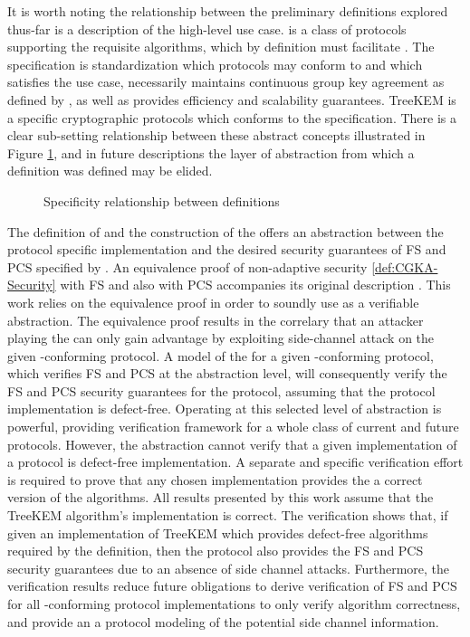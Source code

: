 It is worth noting the relationship between the preliminary definitions explored thus-far
 is a description of the high-level use case.
 is a class of protocols supporting the requisite algorithms, which by definition must facilitate .
The  specification is standardization which protocols may conform to and which satisfies the  use case, necessarily maintains continuous group key agreement as defined by , as well as provides efficiency and scalability guarantees.
TreeKEM is a specific cryptographic protocols which conforms to the  specification.
There is a clear sub-setting relationship between these abstract concepts illustrated in Figure \ref{fig:venn-protocols}, and in future descriptions the layer of abstraction from which a definition was defined may be elided.

\begin{figure}
\centering
\caption{\label{fig:venn-protocols}Specificity relationship between definitions}
\end{figure}

The definition of  and the construction of the \CGKAsec offers an abstraction between the protocol specific implementation and the desired security guarantees of FS and PCS specified by .
An equivalence proof of non-adaptive  security \ref{def:CGKA-Security} with FS and also with PCS accompanies its original description \autocite{alwen2020security}.
This work relies on the equivalence proof in order to soundly use  as a verifiable abstraction.
The equivalence proof results in the correlary that an attacker playing the \CGKAsec can only gain advantage by exploiting side-channel attack on the given -conforming protocol.
A model of the \CGKAsec for a given -conforming protocol, which verifies FS and PCS at the abstraction level, will consequently verify the FS and PCS security guarantees for the protocol, assuming that the protocol implementation is defect-free.
Operating at this selected level of abstraction is powerful, providing verification framework for a whole class of current and future protocols.
However, the  abstraction cannot verify that a given implementation of a protocol is defect-free implementation.
A separate and specific verification effort is required to prove that any chosen implementation provides the a correct version of the  algorithms.
All results presented by this work assume that the TreeKEM algorithm's implementation is correct.
The verification shows that, if given an implementation of TreeKEM which provides defect-free algorithms required by the  definition, then the protocol also provides the FS and PCS security guarantees due to an absence of side channel attacks.
Furthermore, the verification results reduce future obligations to derive verification of FS and PCS for all -conforming protocol implementations to only verify algorithm correctness, and provide an a protocol modeling of the potential side channel information.
